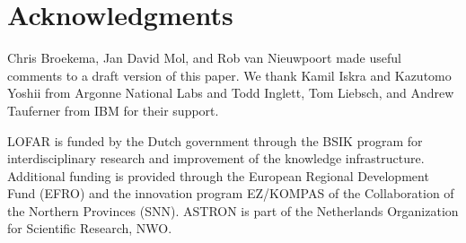 \documentclass[journal]{IEEEtran}
\begin{document}



\section*{Acknowledgments}

Chris Broekema, Jan David Mol, and Rob van Nieuwpoort made useful comments to
a draft version of this paper.
We thank Kamil Iskra and Kazutomo Yoshii from Argonne National Labs and 
Todd Inglett, Tom Liebsch, and Andrew Tauferner from IBM for their support.

LOFAR is funded by the Dutch government through the
BSIK program for interdisciplinary research and
improvement of the knowledge infrastructure. Additional
funding is provided through the European Regional
Development Fund (EFRO) and the innovation program
EZ/KOMPAS of the Collaboration of the Northern
Provinces (SNN). ASTRON is part of the Netherlands
Organization for Scientific Research, NWO.





\end{document}
